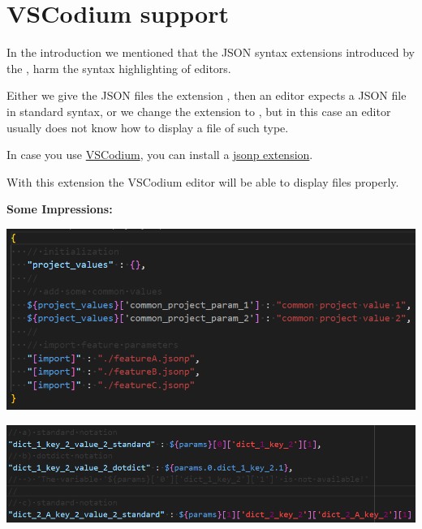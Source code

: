 
\newpage

\section{VSCodium support}

In the introduction we mentioned that the JSON syntax extensions introduced by the \pkg, harm the syntax highlighting of editors.

Either we give the JSON files the extension , then an editor expects a JSON file in standard syntax,
or we change the extension to , but in this case an editor usually does not know how to display a file of such type.

In case you use \href{https://vscodium.com/}{VSCodium}, you can install a
\href{https://github.com/test-fullautomation/vscode-jsonp}{jsonp extension}. 

With this extension the VSCodium editor will be able to display  files properly.

\vspace{2ex}

\textbf{Some Impressions:}

\includegraphics{./pictures/screenshot1.png}

\vspace{2ex}

\includegraphics{./pictures/screenshot2.png}

